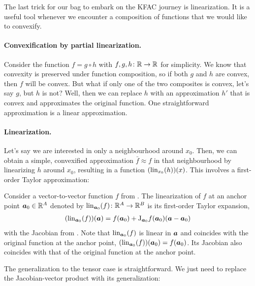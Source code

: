 The last trick for our bag to embark on the KFAC journey is linearization.
It is a useful tool whenever we encounter a composition of functions that we would like to convexify.

\paragraph{Convexification by partial linearization.}
Consider \eg the function $f = g \circ h$ with $f,g,h\colon {\mathbb{R}} \to {\mathbb{R}}$ for simplicity.
We know that convexity is preserved under function composition, so if both $g$ and $h$ are convex, then $f$ will be convex.
But what if only one of the two composites is convex, let's say $g$, but $h$ is not?
Well, then we can replace $h$ with an approximation $h'$ that is convex and approximates the original function.
One straightforward approximation is a linear approximation.

\paragraph{Linearization.} Let's say we are interested in only a neighbourhood around $x_0$.
Then, we can obtain a simple, convexified approximation $\bar{f} \approx f$ in that neighbourhood by linearizing $h$ around $x_0$, resulting in a function $(\operatorname{lin}_{x_0}(h))(x)$.
This involves a first-order Taylor approximation:

\begin{definition}\label{def:vector_linearization}
  Consider a vector-to-vector function $f$ from .
  The linearization of $f$ at an anchor point ${\bm{a}}_0 \in {\mathbb{R}}^A$ denoted by $\operatorname{lin}_{{\bm{a}}_0}(f)\colon {\mathbb{R}}^A \to {\mathbb{R}}^B$ is its first-order Taylor expansion,
  \begin{align*}
    (\operatorname{lin}_{{\bm{a}}_0}(f))({\bm{a}}) = f({\bm{a}}_0) + \mathrm{J}_{{\bm{a}}_0}f({\bm{a}}_0) ({\bm{a}} - {\bm{a}}_0)
  \end{align*}
  with the Jacobian from .
  Note that $\operatorname{lin}_{{\bm{a}}_0}(f)$ is linear in ${\bm{a}}$ and coincides with the original function at the anchor point, $(\operatorname{lin}_{{\bm{a}}_0}(f))({\bm{a}}_0) = f({\bm{a}}_0)$.
  Its Jacobian also coincides with that of the original function at the anchor point.
\end{definition}

The generalization to the tensor case is straightforward.
We just need to replace the Jacobian-vector product with its generalization:

